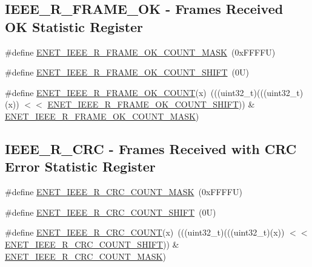 \subsection*{I\+E\+E\+E\+\_\+\+R\+\_\+\+F\+R\+A\+M\+E\+\_\+\+OK -\/ Frames Received OK Statistic Register}
\begin{DoxyCompactItemize}
\item 
\#define \mbox{\hyperlink{group___e_n_e_t___register___masks_ga61cc0d2a38667a1263e2233c7f9a4270}{E\+N\+E\+T\+\_\+\+I\+E\+E\+E\+\_\+\+R\+\_\+\+F\+R\+A\+M\+E\+\_\+\+O\+K\+\_\+\+C\+O\+U\+N\+T\+\_\+\+M\+A\+SK}}~(0x\+F\+F\+F\+F\+U)
\item 
\#define \mbox{\hyperlink{group___e_n_e_t___register___masks_ga18b9d145aab58ab10347846c95e949a3}{E\+N\+E\+T\+\_\+\+I\+E\+E\+E\+\_\+\+R\+\_\+\+F\+R\+A\+M\+E\+\_\+\+O\+K\+\_\+\+C\+O\+U\+N\+T\+\_\+\+S\+H\+I\+FT}}~(0\+U)
\item 
\#define \mbox{\hyperlink{group___e_n_e_t___register___masks_gaad53aabe1c637f933cde5311c9042ac7}{E\+N\+E\+T\+\_\+\+I\+E\+E\+E\+\_\+\+R\+\_\+\+F\+R\+A\+M\+E\+\_\+\+O\+K\+\_\+\+C\+O\+U\+NT}}(x)~(((uint32\+\_\+t)(((uint32\+\_\+t)(x)) $<$$<$ \mbox{\hyperlink{group___e_n_e_t___register___masks_ga18b9d145aab58ab10347846c95e949a3}{E\+N\+E\+T\+\_\+\+I\+E\+E\+E\+\_\+\+R\+\_\+\+F\+R\+A\+M\+E\+\_\+\+O\+K\+\_\+\+C\+O\+U\+N\+T\+\_\+\+S\+H\+I\+FT}})) \& \mbox{\hyperlink{group___e_n_e_t___register___masks_ga61cc0d2a38667a1263e2233c7f9a4270}{E\+N\+E\+T\+\_\+\+I\+E\+E\+E\+\_\+\+R\+\_\+\+F\+R\+A\+M\+E\+\_\+\+O\+K\+\_\+\+C\+O\+U\+N\+T\+\_\+\+M\+A\+SK}})
\end{DoxyCompactItemize}
\subsection*{I\+E\+E\+E\+\_\+\+R\+\_\+\+C\+RC -\/ Frames Received with C\+RC Error Statistic Register}
\begin{DoxyCompactItemize}
\item 
\#define \mbox{\hyperlink{group___e_n_e_t___register___masks_ga58cf98c5746ff20054f1870ab0c9bc5e}{E\+N\+E\+T\+\_\+\+I\+E\+E\+E\+\_\+\+R\+\_\+\+C\+R\+C\+\_\+\+C\+O\+U\+N\+T\+\_\+\+M\+A\+SK}}~(0x\+F\+F\+F\+F\+U)
\item 
\#define \mbox{\hyperlink{group___e_n_e_t___register___masks_ga68234049dc9eac210f0412acb75b5aad}{E\+N\+E\+T\+\_\+\+I\+E\+E\+E\+\_\+\+R\+\_\+\+C\+R\+C\+\_\+\+C\+O\+U\+N\+T\+\_\+\+S\+H\+I\+FT}}~(0\+U)
\item 
\#define \mbox{\hyperlink{group___e_n_e_t___register___masks_ga5f2922a546db478712a69bde97e43507}{E\+N\+E\+T\+\_\+\+I\+E\+E\+E\+\_\+\+R\+\_\+\+C\+R\+C\+\_\+\+C\+O\+U\+NT}}(x)~(((uint32\+\_\+t)(((uint32\+\_\+t)(x)) $<$$<$ \mbox{\hyperlink{group___e_n_e_t___register___masks_ga68234049dc9eac210f0412acb75b5aad}{E\+N\+E\+T\+\_\+\+I\+E\+E\+E\+\_\+\+R\+\_\+\+C\+R\+C\+\_\+\+C\+O\+U\+N\+T\+\_\+\+S\+H\+I\+FT}})) \& \mbox{\hyperlink{group___e_n_e_t___register___masks_ga58cf98c5746ff20054f1870ab0c9bc5e}{E\+N\+E\+T\+\_\+\+I\+E\+E\+E\+\_\+\+R\+\_\+\+C\+R\+C\+\_\+\+C\+O\+U\+N\+T\+\_\+\+M\+A\+SK}})
\end{DoxyCompactItemize}
